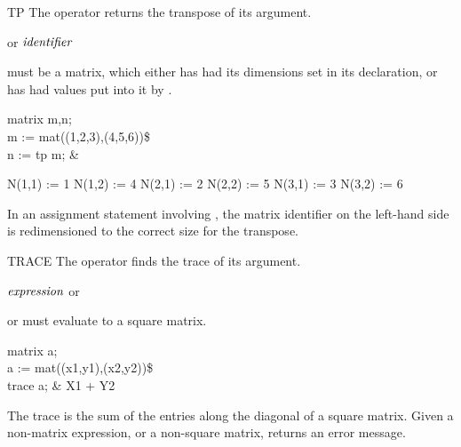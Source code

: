 \begin{Operator}[tp]{TP}
The  operator returns the transpose of its 
 argument.
\begin{Syntax}
  or  \(\meta{identifier}\)
\end{Syntax}

 must be a matrix, which either has had its dimensions set
in its declaration, or has had values put into it by .

\begin{Examples}
matrix m,n; \\
m := mat((1,2,3),(4,5,6))\$ \\
n := tp m;                   &
\begin{multilineoutput}{6cm}
N(1,1) := 1
N(1,2) := 4
N(2,1) := 2
N(2,2) := 5
N(3,1) := 3
N(3,2) := 6
\end{multilineoutput}
\end{Examples}
\begin{Comments}
In an assignment statement involving , the matrix identifier on the
left-hand side is redimensioned to the correct size for the transpose.
\end{Comments}
\end{Operator}


\begin{Operator}[trace]{TRACE}
The  operator finds the trace of its  argument.
\begin{Syntax}
\(\meta{expression}\) or  
\end{Syntax}

 or  must evaluate to a square
matrix.

\begin{Examples}
matrix a; \\
a := mat((x1,y1),(x2,y2))\$ \\
trace a;                     &         X1 + Y2
\end{Examples}
\begin{Comments}
The trace is the sum of the entries along the diagonal of a square matrix.
Given a non-matrix expression, or a non-square matrix,  returns
an error message.
\end{Comments}
\end{Operator}



